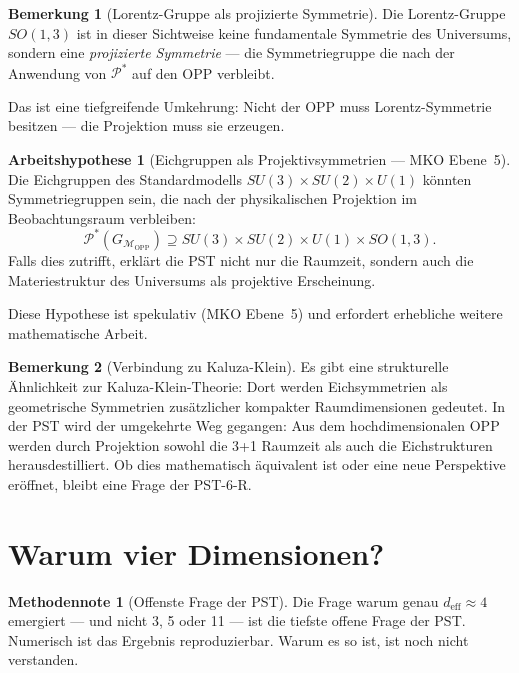 \documentclass[11pt,a4paper]{article}
\theoremstyle{plain}
\theoremstyle{definition}
\newtheorem{remark}{Bemerkung}[section]
\newtheorem{methodennote}{Methodennote}[section]
\newtheorem{hypothese}{Arbeitshypothese}[section]
\newcommand{\OPP}{\mathcal{M}_{\mathrm{OPP}}}
\newcommand{\deff}{d_{\mathrm{eff}}}
\newcommand{\Proj}{\mathcal{P}}
\begin{document}
\begin{remark}[Lorentz-Gruppe als projizierte Symmetrie]
Die Lorentz-Gruppe $SO(1,3)$ ist in dieser Sichtweise keine
fundamentale Symmetrie des Universums, sondern eine
\emph{projizierte Symmetrie} --- die Symmetriegruppe die nach der
Anwendung von $\Proj^\ast$ auf den OPP verbleibt.

Das ist eine tiefgreifende Umkehrung: Nicht der OPP muss
Lorentz-Symmetrie besitzen --- die Projektion muss sie erzeugen.
\end{remark}

\begin{hypothese}[Eichgruppen als Projektivsymmetrien --- MKO Ebene~5]
Die Eichgruppen des Standardmodells
$SU(3) \times SU(2) \times U(1)$ k\"{o}nnten Symmetriegruppen sein,
die nach der physikalischen Projektion im Beobachtungsraum verbleiben:
\[
  \Proj^\ast(G_{\OPP}) \supseteq SU(3) \times SU(2) \times U(1)
  \times SO(1,3).
\]
Falls dies zutrifft, erkl\"{a}rt die PST nicht nur die Raumzeit, sondern
auch die Materiestruktur des Universums als projektive Erscheinung.

Diese Hypothese ist spekulativ (MKO Ebene~5) und erfordert erhebliche
weitere mathematische Arbeit.
\end{hypothese}

\begin{remark}[Verbindung zu Kaluza-Klein]
Es gibt eine strukturelle \"{A}hnlichkeit zur Kaluza-Klein-Theorie: Dort
werden Eichsymmetrien als geometrische Symmetrien zus\"{a}tzlicher
kompakter Raumdimensionen gedeutet. In der PST wird der umgekehrte
Weg gegangen: Aus dem hochdimensionalen OPP werden durch Projektion
sowohl die 3+1 Raumzeit als auch die Eichstrukturen herausdestilliert.
Ob dies mathematisch \"{a}quivalent ist oder eine neue Perspektive
er\"{o}ffnet, bleibt eine Frage der PST-6-R.
\end{remark}

\section{Warum vier Dimensionen?}

\begin{methodennote}[Offenste Frage der PST]
Die Frage warum genau $\deff \approx 4$ emergiert --- und nicht 3, 5
oder 11 --- ist die tiefste offene Frage der PST. Numerisch ist das
Ergebnis reproduzierbar. Warum es so ist, ist noch nicht verstanden.
\end{methodennote}
\end{document}
